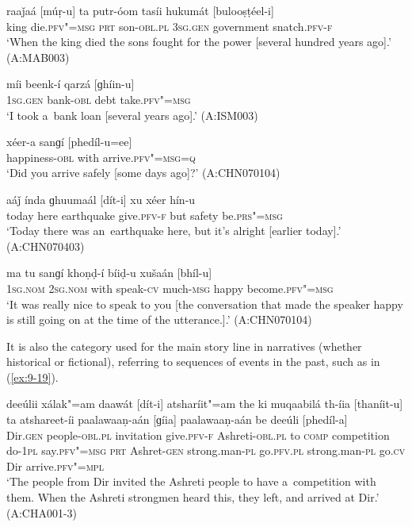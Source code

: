 \begin{exe}
\ex
\label{ex:9-14}
\gll raaǰaá [múṛ-u] ta putr-óom tasíi hukumát [bulooṣṭéel-i] \\
king die.\textsc{pfv"=msg} \textsc{prt} son-\textsc{obl.pl} \textsc{3sg.gen} government snatch.\textsc{pfv-f} \\
\glt `When the king died the sons fought for the power [several hundred years ago].' (A:MAB003)

\ex
\label{ex:9-15}
\gll míi beenk-í qarzá [ɡhíin-u]  \\
\textsc{1sg.gen} bank-\textsc{obl} debt take.\textsc{pfv"=msg} \\
\glt `I took a~bank loan [several years ago].' (A:ISM003) 

\ex
\label{ex:9-16}
\gll xéer-a sanɡí [phedíl-u=ee] \\
happiness-\textsc{obl} with arrive.\textsc{pfv"=msg=q} \\
\glt `Did you arrive safely [some days ago]?' (A:CHN070104)

\ex
\label{ex:9-17}
\gll aáǰ índa ɡhuumaál [dít-i] xu xéer hín-u \\
today here earthquake give.\textsc{pfv-f} but safety be.\textsc{prs"=msg}  \\
\glt `Today there was an~earthquake here, but it's alright [earlier today].' (A:CHN070403)

\ex
\label{ex:9-18}
\gll ma tu sanɡí khoṇḍ-í bíiḍ-u xušaán [bhíl-u] \\
\textsc{1sg.nom} \textsc{2}\textsc{sg.nom} with speak-\textsc{cv} much-\textsc{msg} happy become.\textsc{pfv"=msg} \\
\glt `It was really nice to speak to you [the conversation that made the speaker happy is still going on at the time of the utterance.].' (A:CHN070104)
\end{exe}

It is also the category used for the main story line in narratives (whether historical or fictional), referring to sequences of events in the past, such as in (\ref{ex:9-19}).

\begin{exe}
\ex
\label{ex:9-19}
\gll deeúlii xálak"=am daawát [dít-i] atsharíit"=am the ki muqaabilá
th-íia  [thaníit-u] ta atshareet-íi paalawaaṇ-aán [ɡíia] paalawaaṇ-aán be deeúli [phedíl-a] \\
Dir.\textsc{gen} people-\textsc{obl.pl} invitation give.\textsc{pfv-f}  Ashreti-\textsc{obl.pl} to \textsc{comp} competition do-\textsc{1pl}  say.\textsc{pfv"=msg} \textsc{prt} Ashret-\textsc{gen} strong.man-\textsc{pl} go.\textsc{pfv.pl}  strong.man-\textsc{pl} go.\textsc{cv} Dir arrive.\textsc{pfv"=mpl} \\
\glt `The people from Dir invited the Ashreti people to have a~competition with them. When the Ashreti strongmen heard this, they left, and arrived at Dir.' (A:CHA001-3)
\end{exe}

